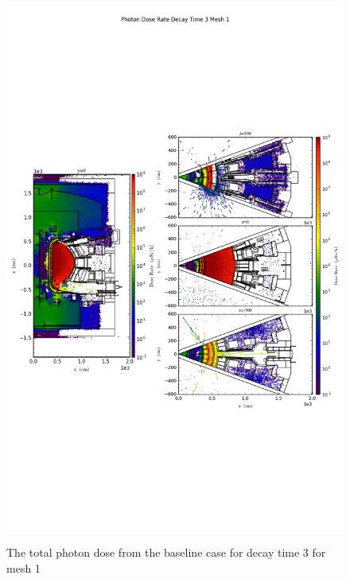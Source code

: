 \begin{figure}[ht!]
\centering
\includegraphics[trim={0cm 9cm 0cm 10cm},clip,scale=0.75]{../plots/final_model_nob4c/Photon_Dose_Rate_Decay_Time_3_Mesh_1.png}
\label{fig:photons_dc3_no4bc_m1_flux}
\caption{The total photon dose from the baseline case for decay time 3 for mesh 1}
\end{figure}
